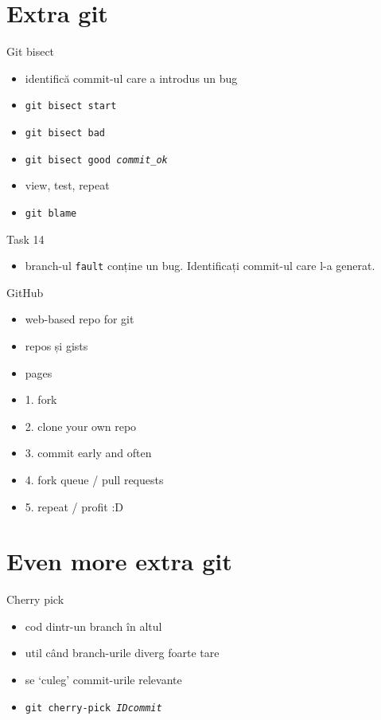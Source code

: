 \documentclass{beamer}
\begin{document}
\section{Extra git}

\begin{frame}{Git bisect}
  \begin{itemize}
    \item identifică commit-ul care a introdus un bug
    \item \texttt{git bisect start}
    \item \texttt{git bisect bad}
    \item \texttt{git bisect good \textit{commit\_ok}}
    \item view, test, repeat
    \pause
    \item \texttt{git blame}
  \end{itemize}
  \pause
  \begin{alertblock}{Task 14}
    \begin{itemize}
      \item branch-ul \texttt{fault} conține un bug. Identificați commit-ul
      care l-a generat.
    \end{itemize}
  \end{alertblock}
\end{frame}

\begin{frame}{GitHub}
  \begin{itemize}
    \item web-based repo for git
    \item repos și gists
    \item pages
    \pause
    \item 1. fork
    \item 2. clone your own repo
    \item 3. commit early and often
    \item 4. fork queue / pull requests
    \item 5. repeat / profit :D
  \end{itemize}
\end{frame}

\section{Even more extra git}

\begin{frame}{Cherry pick}
  \begin{itemize}
    \item cod dintr-un branch în altul
    \item util când branch-urile diverg foarte tare
    \item se `culeg' commit-urile relevante
    \item \texttt{git cherry-pick \textit{IDcommit}}
  \end{itemize}
\end{frame}

\end{document}
